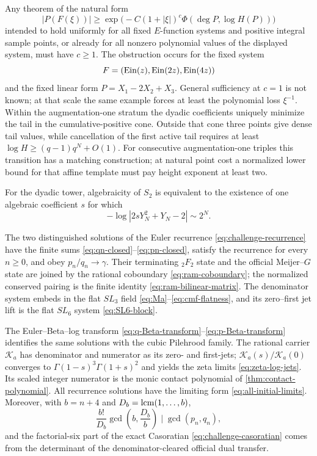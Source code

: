 \begin{theorem}
\label{thm:intro-barrier}
Any theorem of the natural form
\[
 |P(F(\xi))|\ge
 \exp\!\bigl(-C(1+|\xi|)^c\Phi(\deg P,\log H(P))\bigr)
\]
intended to hold uniformly for all fixed \(E\)-function systems and positive
integral sample points, or already for all nonzero polynomial values of the
displayed system, must have \(c\ge1\).  The obstruction occurs for the fixed
system
\[
 F=(\operatorname{Ein}(z),\operatorname{Ein}(2z),\operatorname{Ein}(4z))
\]
and the fixed linear form \(P=X_1-2X_2+X_3\).  General sufficiency at
\(c=1\) is not known; at that scale the same example forces at least the
polynomial loss \(\xi^{-1}\).  Within the augmentation-one stratum the
dyadic coefficients uniquely minimize the tail in the cumulative-positive
cone.  Outside that cone three points give dense tail values, while
cancellation of the first active tail requires at least
\(\log H\ge(q-1)q^N+O(1)\).  For consecutive augmentation-one triples this
transition has a matching construction; at natural point cost a normalized
lower bound for that affine template must pay height exponent at least two.

For the dyadic tower, algebraicity of \(S_2\) is
equivalent to the existence of one algebraic coefficient \(s\) for which
\[
 -\log|2sY_N^2+Y_N-2|\sim2^N.
\]
\end{theorem}

\begin{theorem}
\label{thm:intro-recurrence}
The two distinguished solutions of the Euler recurrence
\eqref{eq:challenge-recurrence} have the finite sums
\eqref{eq:qn-closed}--\eqref{eq:pn-closed}, satisfy the recurrence for every
\(n\ge0\), and obey \(p_n/q_n\to\gamma\).  Their terminating
\({}_2F_2\) state and the official Meijer--\(G\) state are joined by the
rational coboundary \eqref{eq:ram-coboundary}; the normalized conserved
pairing is the finite identity \eqref{eq:ram-bilinear-matrix}.  The
denominator system embeds in the flat \(SL_3\) field
\eqref{eq:Ma}--\eqref{eq:cmf-flatness}, and its zero--first jet lift is the
flat \(SL_6\) system \eqref{eq:SL6-block}.

The Euler--Beta--log transform
\eqref{eq:q-Beta-transform}--\eqref{eq:p-Beta-transform} identifies the
same solutions with the cubic Pilehrood family.  The rational carrier
\(\mathscr K_a\) has denominator and numerator as its zero- and first-jets;
\(\mathscr K_a(s)/\mathscr K_a(0)\) converges to
\(\Gamma(1-s)^3\Gamma(1+s)^2\) and yields the zeta limits
\eqref{eq:zeta-log-jets}.  Its scaled integer numerator is the monic contact
polynomial of \cref{thm:contact-polynomial}.  All recurrence solutions have
the limiting form \eqref{eq:all-initial-limits}.  Moreover, with
\(b=n+4\) and \(D_b=\operatorname{lcm}(1,\ldots,b)\),
\[
 \frac{b!}{D_b}\gcd\!\left(b,\frac{D_b}{b}\right)
 \mid\gcd(p_n,q_n),
\]
and the factorial-six part of the exact Casoratian
\eqref{eq:challenge-casoratian} comes from the determinant of the
denominator-cleared official dual transfer.
\end{theorem}

